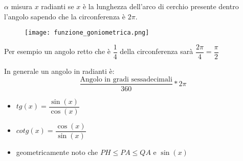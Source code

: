 \documentclass[../main.tex, class=article]{subfiles}
\begin{document}
$ \alpha $ misura $ x $ radianti se  $ x $ è la lunghezza dell'arco di cerchio presente dentro l'angolo sapendo che la circonferenza è $ \boxed{2\pi}$.
\begin{figure}[H]
  	\texttt{[image: funzione\_goniometrica.png]}
  	\caption{}
        \label{fig:funzione_trigonometrica}
\end{figure}



\begin{exmp}
        Per esempio un angolo retto che è $ \dfrac{1}{4} $ della circonferenza sarà $\dfrac{2\pi}{4} = \dfrac{\pi}{2}$ 
\end{exmp}

In generale un angolo in radianti è:
\begin{equation*}
       \frac{\mbox{Angolo in gradi sessadecimali}}{360} * 2\pi 
\end{equation*}

\begin{itemize}
        \item $ tg(x) = \dfrac{\sin(x)}{\cos(x)} $
        \item $ cotg(x) = \dfrac{\cos(x)}{\sin(x)} $
        \item geometricamente noto che $PH \le PA \le QA $ e $ \sin(x) $
\end{itemize}
\end{document}
